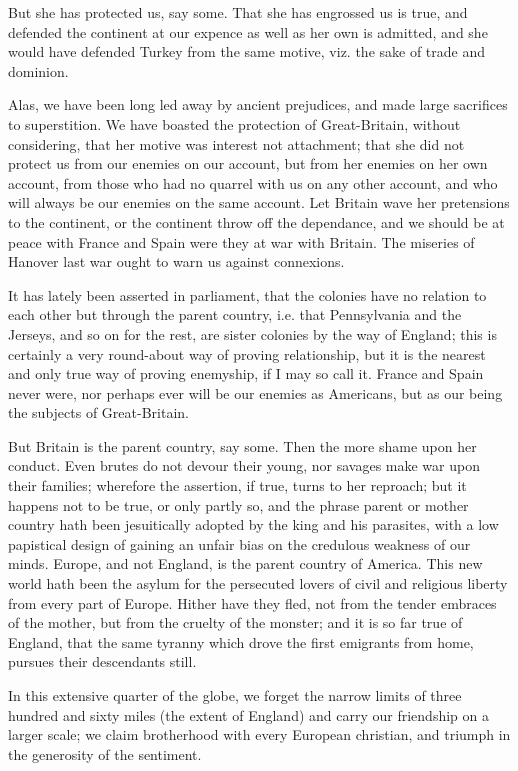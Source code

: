 \documentclass[12pt,oneside]{memoir}
\begin{document}
But she has protected us, say some. That she has engrossed us is true, and defended the continent at our expence as well as her own is admitted, and she would have defended Turkey from the same motive, viz. the sake of trade and dominion.

Alas, we have been long led away by ancient prejudices, and made large sacrifices to superstition. We have boasted the protection of Great-Britain, without considering, that her motive was interest not attachment; that she did not protect us from our enemies on our account, but from her enemies on her own account, from those who had no quarrel with us on any other account, and who will always be our enemies on the same account. Let Britain wave her pretensions to the continent, or the continent throw off the dependance, and we should be at peace with France and Spain were they at war with Britain. The miseries of Hanover last war ought to warn us against connexions.

It has lately been asserted in parliament, that the colonies have no relation to each other but through the parent country, i.e. that Pennsylvania and the Jerseys, and so on for the rest, are sister colonies by the way of England; this is certainly a very round-about way of proving relationship, but it is the nearest and only true way of proving enemyship, if I may so call it. France and Spain never were, nor perhaps ever will be our enemies as Americans, but as our being the subjects of Great-Britain.

But Britain is the parent country, say some. Then the more shame upon her conduct. Even brutes do not devour their young, nor savages make war upon their families; wherefore the assertion, if true, turns to her reproach; but it happens not to be true, or only partly so, and the phrase parent or mother country hath been jesuitically adopted by the king and his parasites, with a low papistical design of gaining an unfair bias on the credulous weakness of our minds. Europe, and not England, is the parent country of America. This new world hath been the asylum for the persecuted lovers of civil and religious liberty from every part of Europe. Hither have they fled, not from the tender embraces of the mother, but from the cruelty of the monster; and it is so far true of England, that the same tyranny which drove the first emigrants from home, pursues their descendants still.

In this extensive quarter of the globe, we forget the narrow limits of three hundred and sixty miles (the extent of England) and carry our friendship on a larger scale; we claim brotherhood with every European christian, and triumph in the generosity of the sentiment.
\end{document}
